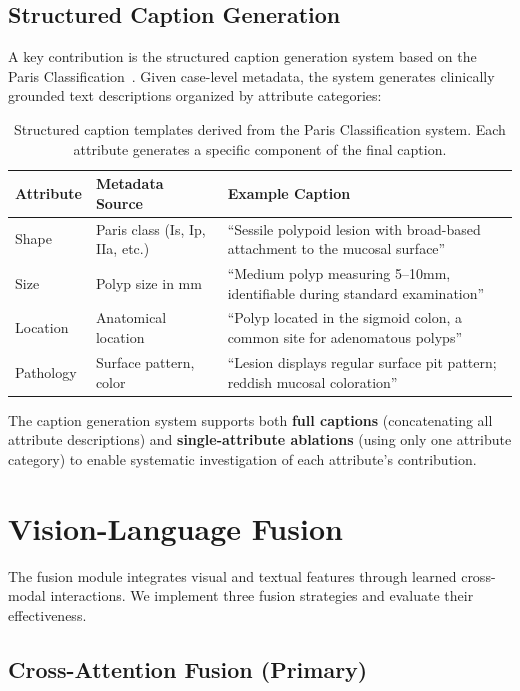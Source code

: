 \subsection{Structured Caption Generation}
\label{sec:approach:captions}

A key contribution is the structured caption generation system based on the Paris Classification~\cite{paris2003paris}. Given case-level metadata, the system generates clinically grounded text descriptions organized by attribute categories:

\begin{table}[htbp]
	\caption{Structured caption templates derived from the Paris Classification system. Each attribute generates a specific component of the final caption.}
	\label{tab:caption_templates}
	\centering
	\begin{tabular}{p{2.5cm}p{4cm}p{6cm}}
		\toprule
		\textbf{Attribute} & \textbf{Metadata Source} & \textbf{Example Caption} \\
		\midrule
		Shape & Paris class (Is, Ip, IIa, etc.) & ``Sessile polypoid lesion with broad-based attachment to the mucosal surface'' \\
		Size & Polyp size in mm & ``Medium polyp measuring 5--10mm, identifiable during standard examination'' \\
		Location & Anatomical location & ``Polyp located in the sigmoid colon, a common site for adenomatous polyps'' \\
		Pathology & Surface pattern, color & ``Lesion displays regular surface pit pattern; reddish mucosal coloration'' \\
		\bottomrule
	\end{tabular}
\end{table}

The caption generation system supports both \textbf{full captions} (concatenating all attribute descriptions) and \textbf{single-attribute ablations} (using only one attribute category) to enable systematic investigation of each attribute's contribution.


\section{Vision-Language Fusion}
\label{sec:approach:fusion}

The fusion module integrates visual and textual features through learned cross-modal interactions. We implement three fusion strategies and evaluate their effectiveness.

\subsection{Cross-Attention Fusion (Primary)}
\label{sec:approach:crossattn}


